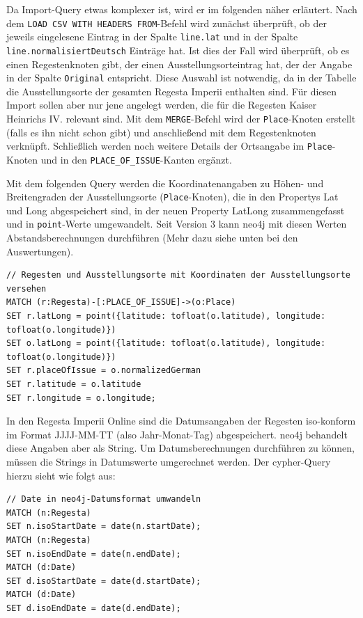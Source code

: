 \documentclass[ngerman,]{scrreprt}
\begin{document}
Da Import-Query etwas komplexer ist, wird er im folgenden näher erläutert. Nach dem \texttt{LOAD\ CSV\ WITH\ HEADERS\ FROM}-Befehl wird zunächst überprüft, ob der jeweils eingelesene Eintrag in der Spalte \texttt{line.lat} und in der Spalte \texttt{line.normalisiertDeutsch} Einträge hat. Ist dies der Fall wird überprüft, ob es einen Regestenknoten gibt, der einen Ausstellungsorteintrag hat, der der Angabe in der Spalte \texttt{Original} entspricht. Diese Auswahl ist notwendig, da in der Tabelle die Ausstellungsorte der gesamten Regesta Imperii enthalten sind. Für diesen Import sollen aber nur jene angelegt werden, die für die Regesten Kaiser Heinrichs IV. relevant sind. Mit dem \texttt{MERGE}-Befehl wird der \texttt{Place}-Knoten erstellt (falls es ihn nicht schon gibt) und anschließend mit dem Regestenknoten verknüpft. Schließlich werden noch weitere Details der Ortsangabe im \texttt{Place}-Knoten und in den \texttt{PLACE\_OF\_ISSUE}-Kanten ergänzt.

Mit dem folgenden Query werden die Koordinatenangaben zu Höhen- und Breitengraden der Ausstellungsorte (\texttt{Place}-Knoten), die in den Propertys Lat und Long abgespeichert sind, in der neuen Property LatLong zusammengefasst und in \texttt{point}-Werte umgewandelt. Seit Version 3 kann neo4j mit diesen Werten Abstandsberechnungen durchführen (Mehr dazu siehe unten bei den Auswertungen).

\begin{verbatim}
// Regesten und Ausstellungsorte mit Koordinaten der Ausstellungsorte versehen
MATCH (r:Regesta)-[:PLACE_OF_ISSUE]->(o:Place)
SET r.latLong = point({latitude: tofloat(o.latitude), longitude: tofloat(o.longitude)})
SET o.latLong = point({latitude: tofloat(o.latitude), longitude: tofloat(o.longitude)})
SET r.placeOfIssue = o.normalizedGerman
SET r.latitude = o.latitude
SET r.longitude = o.longitude;
\end{verbatim}

In den Regesta Imperii Online sind die Datumsangaben der Regesten iso-konform im Format JJJJ-MM-TT (also Jahr-Monat-Tag) abgespeichert. neo4j behandelt diese Angaben aber als String. Um Datumsberechnungen durchführen zu können, müssen die Strings in Datumswerte umgerechnet werden. Der cypher-Query hierzu sieht wie folgt aus:

\begin{verbatim}
// Date in neo4j-Datumsformat umwandeln
MATCH (n:Regesta)
SET n.isoStartDate = date(n.startDate);
MATCH (n:Regesta)
SET n.isoEndDate = date(n.endDate);
MATCH (d:Date)
SET d.isoStartDate = date(d.startDate);
MATCH (d:Date)
SET d.isoEndDate = date(d.endDate);
\end{verbatim}
\end{document}
